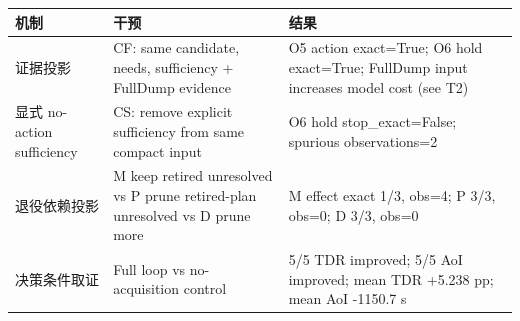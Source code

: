 \begin{tabular}{p{}p{}p{}}
\toprule
机制 & 干预 & 结果 \\
\midrule
证据投影 & CF: same candidate, needs, sufficiency + FullDump evidence & O5 action exact=True; O6 hold exact=True; FullDump input increases model cost (see T2) \\
显式 no-action sufficiency & CS: remove explicit sufficiency from same compact input & O6 hold stop\_exact=False; spurious observations=2 \\
退役依赖投影 & M keep retired unresolved vs P prune retired-plan unresolved vs D prune more & M effect exact 1/3, obs=4; P 3/3, obs=0; D 3/3, obs=0 \\
决策条件取证 & Full loop vs no-acquisition control & 5/5 TDR improved; 5/5 AoI improved; mean TDR +5.238 pp; mean AoI -1150.7 s \\
\bottomrule
\end{tabular}
